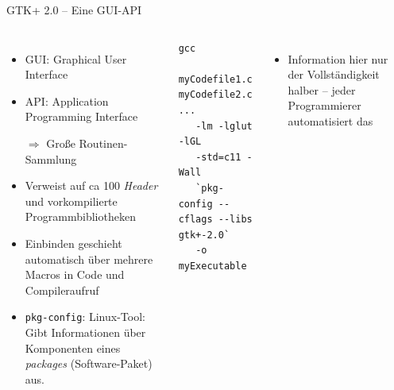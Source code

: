 \begin{frame}[fragile]{GTK+ 2.0 -- Eine GUI-API}
%
\begin{columns}[T]
\begin{itemize}
\item GUI: Graphical User Interface
\item API: Application Programming Interface
\item[$\Rightarrow$] Große Routinen-Sammlung
\item Verweist auf ca 100 \emph{Header} und vorkompilierte Programmbibliotheken
\item Einbinden geschieht automatisch über mehrere Macros in Code und Compileraufruf
\item \texttt{pkg-config}: Linux-Tool: Gibt Informationen über Komponenten eines \emph{packages} (Software-Paket) aus.
\end{itemize}
%
\begin{cmdbox}
\begin{verbatim}
gcc 
   myCodefile1.c myCodefile2.c ...
   -lm -lglut -lGL
   -std=c11 -Wall 
   `pkg-config --cflags --libs gtk+-2.0`
   -o myExecutable
\end{verbatim}
\end{cmdbox}
%
\begin{itemize}
\item Information hier nur der Vollständigkeit halber -- jeder Programmierer automatisiert das
\end{itemize}
\end{columns}
%
\end{frame}


